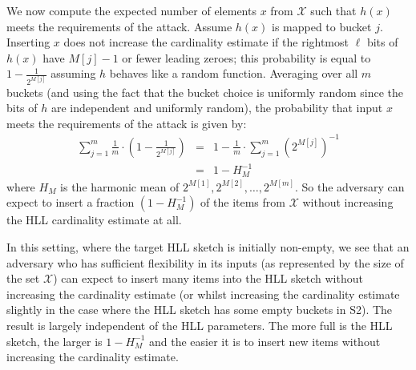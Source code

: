 \documentclass[sigconf, anonymous, dvipsnames]{acmart} %
\begin{document}
We now compute the expected number of elements $x$ from ${\mathcal{X}}$ such that $h(x)$ meets the requirements of the attack.  %
Assume $h(x)$ is mapped to bucket $j$. Inserting $x$ does not increase the cardinality estimate if the rightmost $\ell$ bits of $h(x)$ have $M[j]-1$ or fewer leading zeroes; this probability is equal to $1-\frac{1}{2^{M[j]}}$ assuming $h$ behaves like a random function. Averaging over all $m$ buckets (and using the fact that the bucket choice is uniformly random since the bits of $h$ are independent and uniformly random), the probability that input $x$ meets the requirements of the attack is given by:
\begin{eqnarray*}
\sum_{j=1}^{m}\frac{1}{m} \cdot (1-\frac{1}{2^{M[j]}}) & = & 1- \frac{1}{m}\cdot \sum_{j=1}^{m} {(2^{M[j]})}^{-1} \\
& = &1 - H_M^{-1} 
\end{eqnarray*}
where $H_M$ is the harmonic mean of $2^{M[1]}, 2^{M[2]}, \ldots, 2^{M[m]}$.
So the adversary can expect to insert a fraction $(1 - H_M^{-1})$ of the items from ${\mathcal{X}}$ without increasing the HLL cardinality estimate at all.


In this setting, where the target HLL sketch is initially non-empty, we see that an adversary who has sufficient flexibility in its inputs (as represented by the size of the set ${\mathcal{X}}$) can expect to insert many items into the HLL sketch without increasing the cardinality estimate (or whilst increasing the cardinality estimate slightly in the case where the HLL sketch has some empty buckets in S2). The result is largely independent of the HLL parameters. The more full is the HLL sketch, the larger is $1-H_M^{-1}$ and the easier it is to insert new items without increasing the cardinality estimate.
\end{document}
